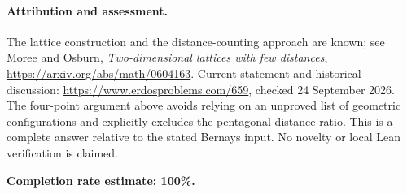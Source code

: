 \paragraph{Attribution and assessment.}
The lattice construction and the distance-counting approach are known; see Moree and Osburn, \emph{Two-dimensional lattices with few distances}, \url{https://arxiv.org/abs/math/0604163}. Current statement and historical discussion: \url{https://www.erdosproblems.com/659}, checked 24 September 2026. The four-point argument above avoids relying on an unproved list of geometric configurations and explicitly excludes the pentagonal distance ratio. This is a complete answer relative to the stated Bernays input. No novelty or local Lean verification is claimed.

\textbf{Completion rate estimate: 100\%.}
